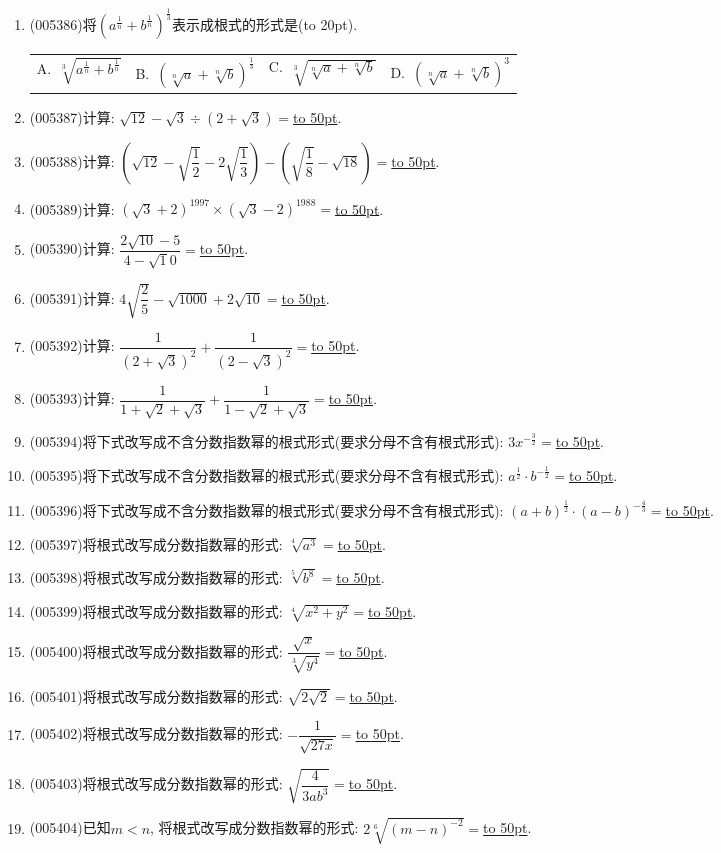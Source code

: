 \documentclass[10pt,a4paper]{article}
\newcommand{\blank}[1]{\underline{\hbox to #1pt{}}}
\newcommand{\bracket}[1]{(\hbox to #1pt{})}
\newcommand{\fourch}[4]{\par\begin{tabular}{p{.23\textwidth}p{.23\textwidth}p{.23\textwidth}p{.23\textwidth}}
A.~#1 &B.~#2& C.~#3& D.~#4
\end{tabular}}
\begin{document}
\begin{enumerate}[1.]
\item {\tiny (005386)}将$(a^{\frac 1n}+b^{\frac 1n})^{\frac 13}$表示成根式的形式是\bracket{20}.
\fourch{$\sqrt [3]{a^{\frac 1n}+b^{\frac 1n}}$}{$(\sqrt[n]a+\sqrt[n]b)^{\frac 13}$}{$\sqrt [3]{\sqrt[n]a+\sqrt[n]b}$}{$(\sqrt[n]a+\sqrt[n]b)^3$}
\item {\tiny (005387)}计算: $\sqrt {12}-\sqrt 3\div (2+\sqrt 3)=$\blank{50}.
\item {\tiny (005388)}计算: $(\sqrt {12}-\sqrt {\dfrac 12}-2\sqrt {\dfrac 13})-(\sqrt {\dfrac 18}-\sqrt {18})=$\blank{50}.
\item {\tiny (005389)}计算: $(\sqrt 3+2)^{1997}	\times (\sqrt 3-2)^{1988}=$\blank{50}.
\item {\tiny (005390)}计算: $\dfrac{2\sqrt {10}-5}{4-\sqrt 10}=$\blank{50}.
\item {\tiny (005391)}计算: $4\sqrt {\dfrac 25}-\sqrt {1000}+2\sqrt {10}=$\blank{50}.
\item {\tiny (005392)}计算: $\dfrac 1{(2+\sqrt 3)^2}+\dfrac 1{(2-\sqrt 3)^2}=$\blank{50}.
\item {\tiny (005393)}计算: $\dfrac 1{1+\sqrt 2+\sqrt 3}+\dfrac 1{1-\sqrt 2+\sqrt 3}=$\blank{50}.
\item {\tiny (005394)}将下式改写成不含分数指数幂的根式形式(要求分母不含有根式形式): $3x^{-\frac 32}=$\blank{50}.
\item {\tiny (005395)}将下式改写成不含分数指数幂的根式形式(要求分母不含有根式形式): $a^{\frac 12}\cdot b^{-\frac 12}=$\blank{50}.
\item {\tiny (005396)}将下式改写成不含分数指数幂的根式形式(要求分母不含有根式形式): $(a+b)^{\frac 12}\cdot (a-b)^{-\frac 43}=$\blank{50}.
\item {\tiny (005397)}将根式改写成分数指数幂的形式: $\sqrt [4]{a^3}=$\blank{50}.
\item {\tiny (005398)}将根式改写成分数指数幂的形式: $\sqrt [5]{b^8}=$\blank{50}.
\item {\tiny (005399)}将根式改写成分数指数幂的形式: $\sqrt [4]{x^2+y^2}=$\blank{50}.
\item {\tiny (005400)}将根式改写成分数指数幂的形式: $\dfrac{\sqrt x}{\sqrt [3]{y^4}}=$\blank{50}.
\item {\tiny (005401)}将根式改写成分数指数幂的形式: $\sqrt {2\sqrt 2}=$\blank{50}.
\item {\tiny (005402)}将根式改写成分数指数幂的形式: $-\dfrac 1{\sqrt {27x}}=$\blank{50}.
\item {\tiny (005403)}将根式改写成分数指数幂的形式: $\sqrt {\dfrac 4{3ab^3}}=$\blank{50}.
\item {\tiny (005404)}已知$m<n$, 将根式改写成分数指数幂的形式: $2\sqrt [6]{(m-n)^{-2}}=$\blank{50}.

\end{enumerate}
\end{document}
